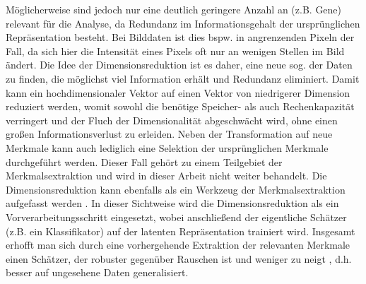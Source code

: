 Möglicherweise sind jedoch nur eine deutlich geringere Anzahl an  (z.B. Gene)
relevant für die Analyse, da Redundanz im Informationsgehalt der ursprünglichen Repräsentation
besteht. Bei Bilddaten ist dies bspw. in angrenzenden Pixeln der Fall, da sich hier die Intensität
eines Pixels oft nur an wenigen Stellen im Bild ändert. Die Idee der Dimensionsreduktion ist es
daher, eine neue sog.  der Daten zu finden, die möglichst viel
Information erhält und Redundanz eliminiert. Damit kann ein hochdimensionaler Vektor auf einen
Vektor von niedrigerer Dimension reduziert werden, womit sowohl die benötige Speicher- als auch
Rechenkapazität verringert und der Fluch der Dimensionalität abgeschwächt wird, ohne einen großen
Informationsverlust zu erleiden. Neben der Transformation auf neue Merkmale kann auch lediglich
eine Selektion der ursprünglichen Merkmale durchgeführt werden. Dieser Fall gehört zu einem
Teilgebiet der Merkmalsextraktion und wird in dieser Arbeit nicht weiter behandelt. Die
Dimensionsreduktion kann ebenfalls als ein Werkzeug der Merkmalsextraktion aufgefasst werden \parencite[3]{Guyon.2006b}. In dieser Sichtweise wird die Dimensionsreduktion als ein
Vorverarbeitungsschritt eingesetzt, wobei anschließend der eigentliche Schätzer (z.B. ein
Klassifikator) auf der latenten Repräsentation trainiert wird. Insgesamt erhofft man sich durch
eine vorhergehende Extraktion der relevanten Merkmale einen Schätzer, der robuster gegenüber
Rauschen ist und weniger zu  neigt \parencites[siehe]{Plastria.2008}{MustafaAbdulSalam.2021}, d.h. besser auf ungesehene Daten
generalisiert.


